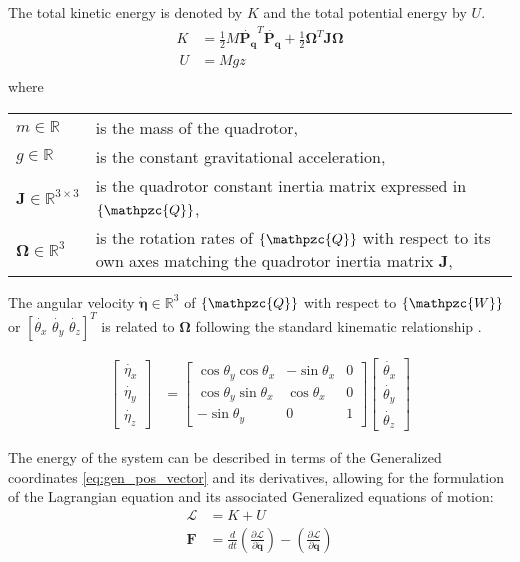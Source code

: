 \documentclass[letterpaper, 12pt]{article}
\begin{document}
The total kinetic energy is denoted by $\mathit{K}$ and the total potential energy by $\mathit{U}$.
\begin{align}
\mathit{K} &=\frac{1}{2}M\mathbf{\dot{P_q}}^T\mathbf{\dot{P_q}}+\frac{1}{2}\mathbf{\Omega}^T\mathbf{J}\mathbf{\Omega}\\\
\mathit{U} &=Mgz\\
\end{align}
where
\begin{center}
	\begin{tabular}{l p{5.775cm}}
		$m \in \mathbb{R}$ & is the mass of the quadrotor,\\
		$g \in \mathbb{R}$ & is the constant gravitational acceleration,\\
		$\mathbf{J} \in \mathbb{R}^{3\times3}$ & is the quadrotor constant inertia matrix expressed in $\lbrace\mathpzc{Q}\rbrace$,\\
		$\mathbf\Omega \in \mathbb{R}^3$ & is the rotation rates of $\lbrace\mathpzc{Q}\rbrace$ with respect to its own axes matching the quadrotor inertia matrix $\mathbf{J} $,\\
	\end{tabular}
\end{center}
The angular velocity $\mathbf{\dot{\eta}} \in \mathbb{R}^3$ of $\lbrace\mathpzc{Q}\rbrace$ with respect to $\lbrace\mathpzc{W}\rbrace$ or $[\dot{\theta_x}\,\,\dot{\theta_y}\,\,\dot{\theta_z}]^\mathit{T}$ is related to $\mathbf\Omega$ following the standard kinematic relationship \cite{Corke_Springer_2011}.

\begin{align}
	\begin{bmatrix}
	\dot{\eta_x} \\ \dot{\eta_y} \\ \dot{\eta_z}
  \end{bmatrix} &= 
  	\begin{bmatrix}
	\cos\theta_y\cos\theta_x &-\sin\theta_x &0 \\
    \cos\theta_y\sin\theta_x &\cos\theta_x &0 \\
    -\sin\theta_y &0 &1
  \end{bmatrix} 
	\begin{bmatrix}
	\dot{\theta_x} \\ \dot{\theta_y} \\ \dot{\theta_z}
  \end{bmatrix}
\label{eq:standard_kinematic_relationship}
\end{align}

The energy of the system can be described in terms of the Generalized coordinates \ref{eq:gen_pos_vector} and its derivatives, allowing for the formulation of the Lagrangian equation and its associated Generalized equations of motion:
\begin{align}
\mathcal{L} &= \mathit{K} + \mathit{U}\\
\mathbf{F} &= \frac{d}{dt}\left(\frac{\partial{\mathcal{L}}}{\partial{\dot{\mathbf{q}}}} \right) - \left(\frac{\partial{\mathcal{L}}}{\partial{\mathbf{q}}} \right) 
\label{eq:Lagrangian}
\end{align}
\end{document}
